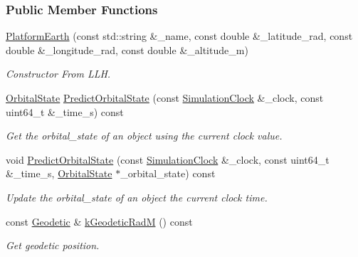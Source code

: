 \subsubsection*{Public Member Functions}
\begin{DoxyCompactItemize}
\item 
\hyperlink{classosse_1_1collaborate_1_1_platform_earth_afc5a80925b8a51fbdb93e0cc8eea3607}{Platform\+Earth} (const std\+::string \&\+\_\+name, const double \&\+\_\+latitude\+\_\+rad, const double \&\+\_\+longitude\+\_\+rad, const double \&\+\_\+altitude\+\_\+m)
\begin{DoxyCompactList}\small\item\em Constructor From L\+LH. \end{DoxyCompactList}\item 
\hyperlink{classosse_1_1collaborate_1_1_orbital_state}{Orbital\+State} \hyperlink{classosse_1_1collaborate_1_1_platform_earth_aff04ed83ab0ae2f7b3bcb1019588efcd}{Predict\+Orbital\+State} (const \hyperlink{classosse_1_1collaborate_1_1_simulation_clock}{Simulation\+Clock} \&\+\_\+clock, const uint64\+\_\+t \&\+\_\+time\+\_\+s) const
\begin{DoxyCompactList}\small\item\em Get the orbital\+\_\+state of an object using the current clock value. \end{DoxyCompactList}\item 
void \hyperlink{classosse_1_1collaborate_1_1_platform_earth_ab49f25fe5d37334918483cfdcef3471a}{Predict\+Orbital\+State} (const \hyperlink{classosse_1_1collaborate_1_1_simulation_clock}{Simulation\+Clock} \&\+\_\+clock, const uint64\+\_\+t \&\+\_\+time\+\_\+s, \hyperlink{classosse_1_1collaborate_1_1_orbital_state}{Orbital\+State} $\ast$\+\_\+orbital\+\_\+state) const
\begin{DoxyCompactList}\small\item\em Update the orbital\+\_\+state of an object the current clock time. \end{DoxyCompactList}\item 
const \hyperlink{classosse_1_1collaborate_1_1_geodetic}{Geodetic} \& \hyperlink{classosse_1_1collaborate_1_1_platform_earth_ac422459d6fb6cf713b52730f7e51f5b0}{k\+Geodetic\+RadM} () const
\begin{DoxyCompactList}\small\item\em Get geodetic position. \end{DoxyCompactList}\end{DoxyCompactItemize}
